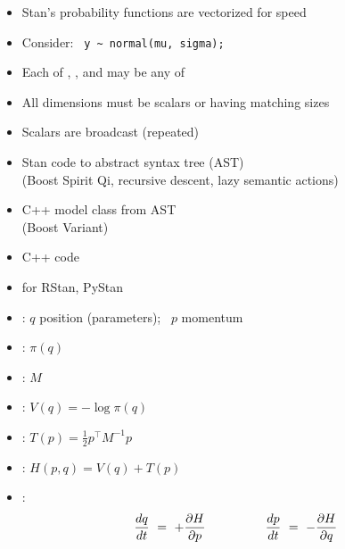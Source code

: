 \documentclass[10pt]{report}
\begin{document}
%
\begin{itemize}
\item Stan's probability functions are vectorized for speed
\item Consider: \ \Verb|y ~ normal(mu, sigma);|
\item Each of , , and  may be any of
\item All dimensions must be scalars or having matching sizes
\item Scalars are broadcast (repeated)
\end{itemize}


%
\begin{itemize}
\item Stan code  to abstract syntax tree (AST)
  \\ {\footnotesize (Boost Spirit Qi, recursive descent, lazy semantic
    actions)}
\item C++ model class  from AST
  \\ {\footnotesize (Boost Variant)}
\item C++ code 
\item {} for RStan, PyStan
\end{itemize}



%
\begin{itemize}
\item {}: $q$ position (parameters); \ $p$ momentum
\item {}: $\pi(q)$
\item {}: $M$
\item {}: $V(q) = -\log \pi(q)$
\item {}: $T(p) = \frac{1}{2} p^{\top} M^{-1} p$
\item {}:  $H(p,q) = V(q) + T(p)$
\item {}:
  \[
  \frac{dq}{dt} \ = \  + \frac{\partial H}{\partial p}
  \hspace*{48pt}
  \frac{dp}{dt} \ = \ - \frac{\partial H}{\partial q}
  \]
\end{itemize}
\end{document}
